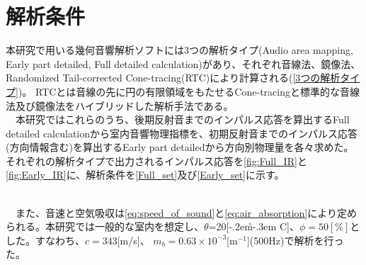\section{解析条件}
本研究で用いる幾何音響解析ソフトには3つの解析タイプ(Audio area mapping, Early part detailed, Full detailed calculation)があり、それぞれ音線法、鏡像法、Randomized Tail-corrected Cone-tracing(RTC)により計算される(\ref{3つの解析タイプ})。
RTCとは音線の先に円の有限領域をもたせるCone-tracingと標準的な音線法及び鏡像法をハイブリッドした解析手法である。
\\　本研究ではこれらのうち、後期反射音までのインパルス応答を算出するFull detailed calculationから室内音響物理指標を、初期反射音までのインパルス応答(方向情報含む)を算出するEarly part detailedから方向別物理量を各々求めた。それぞれの解析タイプで出力されるインパルス応答を\ref{fig:Full_IR}と\ref{fig:Early_IR}に、解析条件を\ref{Full_set}及び\ref{Early_set}に示す。

\begin{table}[htbp]
\centering
\caption{解析手法と出力データ}
\label{3つの解析タイプ}
\end{table}






\\　また、音速と空気吸収は\ref{eq:speed_of_sound}と\ref{eq:air_absorption}により定められる。本研究では一般的な室内を想定し、$\theta$=20[{\kern-.2em\r{}\kern-.3em C}]、$\phi=50[\%]$とした。すなわち、$c=343$[m/s]、 $m_b=0.63\times10^{-3}$[m$^{-1}$](500Hz)で解析を行った。

